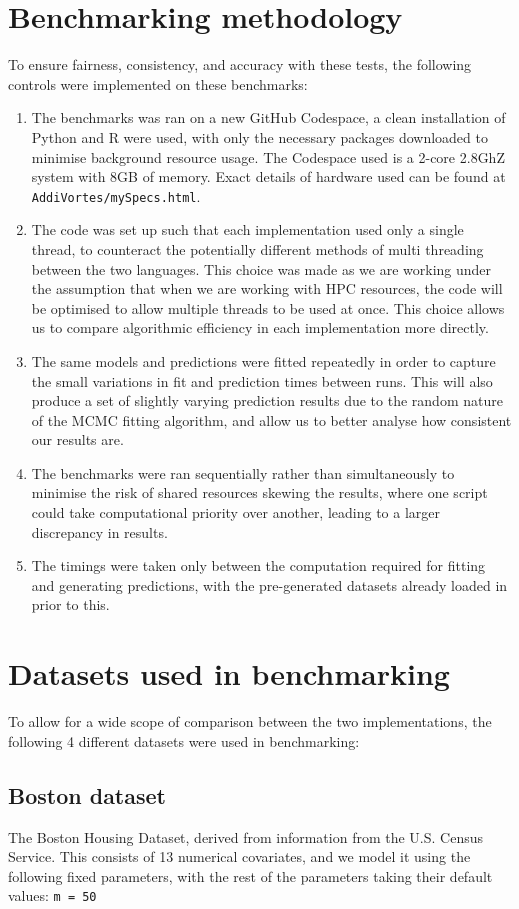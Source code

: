 \documentclass[11pt,twoside,a4paper]{article}
\begin{document}
\section{Benchmarking methodology}
To ensure fairness, consistency, and accuracy with these tests, the following controls were implemented on these benchmarks:
\begin{enumerate}
	\item The benchmarks was ran on a new GitHub Codespace, a clean installation of Python and R were used, with only the necessary packages downloaded to minimise background resource usage. The Codespace used is a 2-core 2.8GhZ system with 8GB of memory. Exact details of hardware used can be found at \nolinkurl{AddiVortes/mySpecs.html}.
	\item The code was set up such that each implementation used only a single thread, to counteract the potentially different methods of multi threading between the two languages. This choice was made as we are working under the assumption that when we are working with HPC resources, the code will be optimised to allow multiple threads to be used at once. This choice allows us to compare algorithmic efficiency in each implementation more directly.
	\item The same models and predictions were fitted repeatedly in order to capture the small variations in fit and prediction times between runs. This will also produce a set of slightly varying prediction results due to the random nature of the MCMC fitting algorithm, and allow us to better analyse how consistent our results are.
	\item The benchmarks were ran sequentially rather than simultaneously to minimise the risk of shared resources skewing the results, where one script could take computational priority over another, leading to a larger discrepancy in results.
	\item The timings were taken only between the computation required for fitting and generating predictions, with the pre-generated datasets already loaded in prior to this.
\end{enumerate}
\newpage
\section{Datasets used in benchmarking}
To allow for a wide scope of comparison between the two implementations, the following 4 different datasets were used in benchmarking:
\subsection{Boston dataset}
The Boston Housing Dataset, derived from information from the U.S. Census Service. This consists of 13 numerical covariates, and we model it using the following fixed parameters, with the rest of the parameters taking their default values: \texttt{m = 50}
\end{document}
